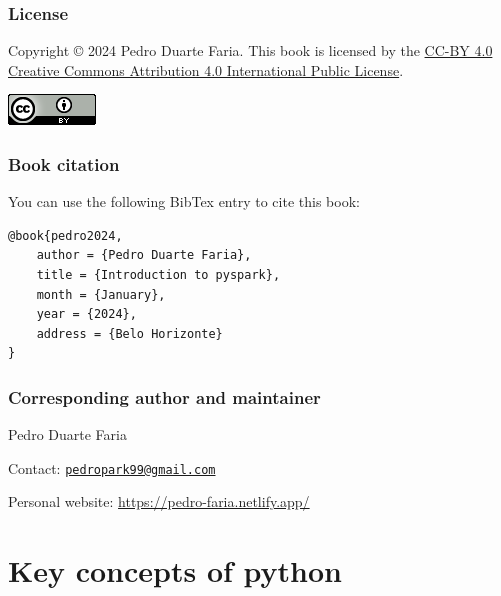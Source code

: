 \documentclass[
  11pt,
  letterpaper,
  DIV=11,
  numbers=noendperiod]{scrreprt}
\begin{document}

\hypertarget{license}{%
\subsection*{License}\label{license}}

Copyright © 2024 Pedro Duarte Faria. This book is licensed by the
\href{https://creativecommons.org/licenses/by/4.0/}{CC-BY 4.0 Creative
Commons Attribution 4.0 International Public License}.

\includegraphics[width=0.91667in,height=\textheight]{Figures/creative-commoms-88x31.png}

\hypertarget{book-citation}{%
\subsection*{Book citation}\label{book-citation}}

You can use the following BibTex entry to cite this book:

\begin{verbatim}
@book{pedro2024,
    author = {Pedro Duarte Faria},
    title = {Introduction to pyspark},
    month = {January},
    year = {2024},
    address = {Belo Horizonte}
}
\end{verbatim}

\hypertarget{corresponding-author-and-maintainer}{%
\subsection*{Corresponding author and
maintainer}\label{corresponding-author-and-maintainer}}

Pedro Duarte Faria

Contact:
\href{mailto:pedropark99@gmail.com}{\nolinkurl{pedropark99@gmail.com}}

Personal website: \url{https://pedro-faria.netlify.app/}


\hypertarget{key-concepts-of-python}{%
\chapter{Key concepts of python}\label{key-concepts-of-python}}
\end{document}

